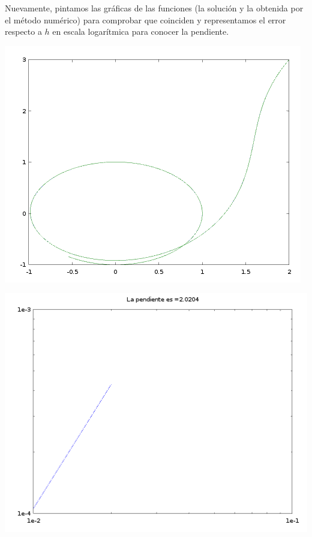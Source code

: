 Nuevamente, pintamos las gráficas de las funciones (la solución y la obtenida por el método numérico) para comprobar que coinciden y representamos el error respecto a $h$ en escala logarítmica para conocer la pendiente.

\begin{center}
    \begin{minipage}{0.49\textwidth}
        \centering
        \includegraphics[width=\textwidth]{img/trapecio_grafica.png}
    \end{minipage}
    \begin{minipage}{.49\textwidth}
        \centering
        \includegraphics[width=\textwidth]{img/trapecio_pendiente.png}
    \end{minipage}
\end{center}

